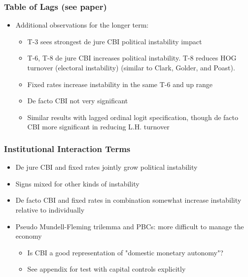 \documentclass{beamer}
\begin{document}
    \begin{frame}
        \frametitle{Table of Lags (see paper)}
        \begin{itemize}
            \item Additional observations for the longer term:
            \begin{itemize}
                \item T-3 sees strongest de jure CBI political instability impact
                \item T-6, T-8 de jure CBI increases political instability. T-8 reduces HOG turnover (electoral instability) (similar to Clark, Golder, and Poast).
                \item Fixed rates increase instability in the same T-6 and up range
                \item De facto CBI not very significant
                \item Similar results with lagged ordinal logit specification, though de facto CBI more significant in reducing L.H. turnover
            \end{itemize}
        \end{itemize}
    \end{frame}

    \begin{frame}
        \frametitle{Institutional Interaction Terms}
        \begin{itemize}
            \item De jure CBI and fixed rates jointly grow political instability
            \item Signs mixed for other kinds of instability
            \item De facto CBI and fixed rates in combination somewhat increase instability relative to individually
            \item Pseudo Mundell-Fleming trilemma and PBCs: more difficult to manage the economy
            \begin{itemize}
                \item Is CBI a good representation of "domestic monetary autonomy"?
                \item See appendix for test with capital controls explicitly
            \end{itemize}
        \end{itemize}
    \end{frame}
\end{document}
